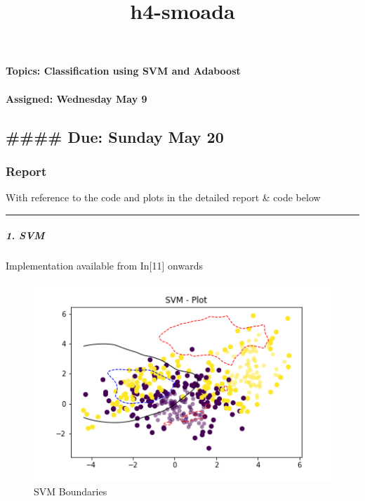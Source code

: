 \documentclass[11pt]{article}
\title{h4-smoada}
\makeatletter
\def\maxwidth{\ifdim\Gin@nat@width>\linewidth\linewidth
    \else\Gin@nat@width\fi}
\let\Oldincludegraphics\includegraphics
\renewcommand{\includegraphics}[1]{\Oldincludegraphics[width=.8\maxwidth]{#1}}
\makeatother
\begin{document}
    
    
    \maketitle
    
    

    
    \paragraph{Topics: Classification using SVM and
Adaboost}\label{topics-classification-using-svm-and-adaboost}

\paragraph{Assigned: Wednesday May 9}\label{assigned-wednesday-may-9}

\subsection{\#\#\#\# Due: Sunday May 20}\label{due-sunday-may-20}

\subsubsection{Report}\label{report}

With reference to the code and plots in the detailed report \& code
below

\begin{center}\rule{0.5\linewidth}{\linethickness}\end{center}

\subparagraph{1. SVM}\label{svm}

Implementation available from In{[}11{]} onwards

\begin{figure}
\centering
\includegraphics{SVM.png}
\caption{SVM Boundaries}
\end{figure}
\end{document}
